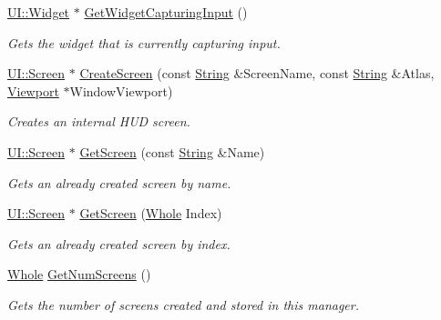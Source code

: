 \begin{DoxyCompactItemize}
\hyperlink{classphys_1_1UI_1_1Widget}{UI::Widget} $\ast$ \hyperlink{classphys_1_1UIManager_ad686b75d17ac2f674a9aa2dd0e097030}{GetWidgetCapturingInput} ()
\begin{DoxyCompactList}\small\item\em Gets the widget that is currently capturing input. \item\end{DoxyCompactList}\item 
\hyperlink{classphys_1_1UI_1_1Screen}{UI::Screen} $\ast$ \hyperlink{classphys_1_1UIManager_acbc318b4d152db7ba83201feb7d8ed12}{CreateScreen} (const \hyperlink{namespacephys_aa03900411993de7fbfec4789bc1d392e}{String} \&ScreenName, const \hyperlink{namespacephys_aa03900411993de7fbfec4789bc1d392e}{String} \&Atlas, \hyperlink{classphys_1_1Viewport}{Viewport} $\ast$WindowViewport)
\begin{DoxyCompactList}\small\item\em Creates an internal HUD screen. \item\end{DoxyCompactList}\item 
\hyperlink{classphys_1_1UI_1_1Screen}{UI::Screen} $\ast$ \hyperlink{classphys_1_1UIManager_ad1ea734a094d7dcac729c6e2aa2987ad}{GetScreen} (const \hyperlink{namespacephys_aa03900411993de7fbfec4789bc1d392e}{String} \&Name)
\begin{DoxyCompactList}\small\item\em Gets an already created screen by name. \item\end{DoxyCompactList}\item 
\hyperlink{classphys_1_1UI_1_1Screen}{UI::Screen} $\ast$ \hyperlink{classphys_1_1UIManager_a82f130c650b679347f3bf66533f75db7}{GetScreen} (\hyperlink{namespacephys_a460f6bc24c8dd347b05e0366ae34f34a}{Whole} Index)
\begin{DoxyCompactList}\small\item\em Gets an already created screen by index. \item\end{DoxyCompactList}\item 
\hyperlink{namespacephys_a460f6bc24c8dd347b05e0366ae34f34a}{Whole} \hyperlink{classphys_1_1UIManager_a3bd28c361f6fc79a182ebd3ec0a26ec7}{GetNumScreens} ()
\begin{DoxyCompactList}\small\item\em Gets the number of screens created and stored in this manager. \item\end{DoxyCompactList}\item 

\end{DoxyCompactItemize}
